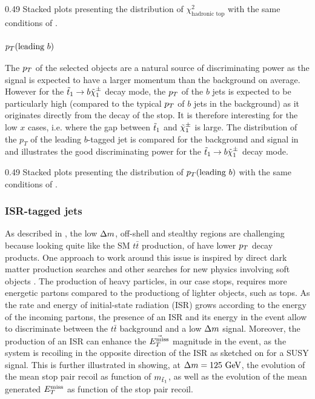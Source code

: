                  {0.49}
                 {Stacked plots presenting the distribution of $\chi^2_\text{hadronic top}$
                 with the same conditions of .}

    \subsubsection{$p_T(\text{leading } b)$}

    The $p_T$ of the selected objects are a natural source of discriminating power as
    the signal is expected to have a larger momentum than the background on average.
    However for the $\tilde{t}_1 \rightarrow b \tilde{\chi}_1^\pm$ decay mode, the $p_T$ of the
    $b$ jets is expected to be particularly high (compared to the typical $p_T$ of $b$ jets in the
    background) as it originates directly from the decay of the stop. It is therefore
    interesting for the low $x$ cases, i.e. where the gap between $\tilde{t}_1$ and
    $\tilde{\chi}_1^\pm$ is large. The distribution of the $p_T$ of the leading
    $b$-tagged jet is compared for the background and signal in 
    and illustrates the good discriminating power for the $\tilde{t}_1 \rightarrow b \tilde{\chi}_1^\pm$
    decay mode.

                 {0.49}
                 {Stacked plots presenting the distribution of $p_T(\text{leading } b)$
                 with the same conditions of .}

    \subsubsection{ISR-tagged jets \label{sec:ISRjets}}

    As described in , the low $\Delta m$,
    off-shell and stealthy regions are challenging because looking quite like the SM
    $t\bar{t}$ production, of have lower $p_T$ decay products. One approach to
    work around this issue is inspired by direct dark matter production searches \cite{EXOmonojet}
    and other searches for new physics involving soft objects \cite{SUScompressedStop}. The
    production of heavy particles, in our case stops, requires more energetic
    partons compared to the productiong of lighter objects, such as tops. As the rate and energy of
    initial-state radiation (ISR) grows according to the energy of the incoming partons,
    the presence of an ISR and its energy in the event allow to discriminate between the $t\bar{t}$
    background and a low $\Delta m$ signal. Moreover, the production of an ISR can enhance
    the $\vec{E_T^\text{miss}}$ magnitude in the event, as the system is recoiling in the opposite
    direction of the ISR as sketched on  for a
    SUSY signal. This is further illustrated in  showing, at
    $\Delta m = 125~\text{GeV}$, the evolution of the mean stop pair recoil as function
    of $m_{\tilde{t}_1}$, as well as the evolution of the mean generated $E_T^\text{miss}$ as function
    of the stop pair recoil.

